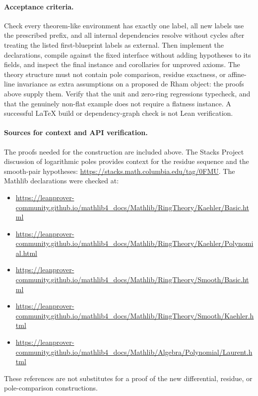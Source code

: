 \documentclass[11pt]{article}
\newcommand{\planned}[1]{\texttt{\detokenize{#1}}}
\theoremstyle{definition}
\theoremstyle{remark}
\begin{document}
\paragraph{Acceptance criteria.}
Check every theorem-like environment has exactly one label, all new labels use the prescribed \planned{dr-} prefix, and all internal dependencies resolve without cycles after treating the listed first-blueprint labels as external. Then implement the declarations, compile against the fixed interface without adding hypotheses to its fields, and inspect the final instance and corollaries for unproved axioms. The theory structure must not contain pole comparison, residue exactness, or affine-line invariance as extra assumptions on a proposed de Rham object: the proofs above supply them. Verify that the unit and zero-ring regressions typecheck, and that the genuinely non-flat example does not require a flatness instance. A successful LaTeX build or dependency-graph check is not Lean verification.

\paragraph{Sources for context and API verification.}
The proofs needed for the construction are included above. The Stacks Project discussion of logarithmic poles provides context for the residue sequence and the smooth-pair hypotheses:
\url{https://stacks.math.columbia.edu/tag/0FMU}.
The Mathlib declarations were checked at:
\begin{itemize}
\item \url{https://leanprover-community.github.io/mathlib4_docs/Mathlib/RingTheory/Kaehler/Basic.html}
\item \url{https://leanprover-community.github.io/mathlib4_docs/Mathlib/RingTheory/Kaehler/Polynomial.html}
\item \url{https://leanprover-community.github.io/mathlib4_docs/Mathlib/RingTheory/Smooth/Basic.html}
\item \url{https://leanprover-community.github.io/mathlib4_docs/Mathlib/RingTheory/Smooth/Kaehler.html}
\item \url{https://leanprover-community.github.io/mathlib4_docs/Mathlib/Algebra/Polynomial/Laurent.html}
\end{itemize}
These references are not substitutes for a proof of the new differential, residue, or pole-comparison constructions.
\end{document}
